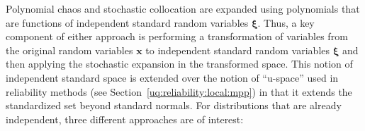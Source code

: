 Polynomial chaos and stochastic collocation are expanded using
polynomials that are functions of independent standard random
variables $\boldsymbol{\xi}$.  Thus, a key component of either
approach is performing a transformation of variables from the original
random variables $\boldsymbol{x}$ to independent standard random
variables $\boldsymbol{\xi}$ and then applying the stochastic
expansion in the transformed space.  %
This notion of independent standard space is extended over the notion
of ``u-space'' used in reliability methods (see
Section~\ref{uq:reliability:local:mpp}) 
in that it extends the standardized set beyond standard normals.
For distributions that are already independent, three different 
approaches are of interest:
